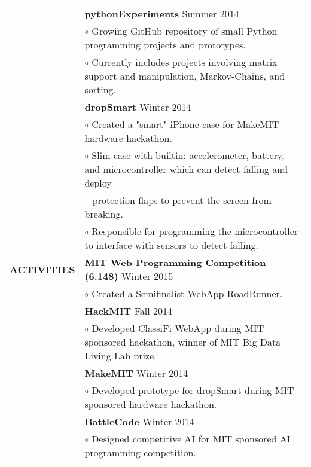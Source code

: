 \documentclass[11pt,letterpaper]{article}
\begin{document}
\begin{tabular}{@{}lp{6.6in}}
&\textbf{pythonExperiments} \hfill Summer 2014\\
&\hspace{10pt}$\circ$ Growing GitHub repository of small Python programming projects and prototypes.\\
&\hspace{10pt}$\circ$ Currently includes projects involving matrix support and manipulation, Markov-Chains, and sorting.\\

&\textbf{dropSmart} \hfill Winter 2014\\
&\hspace{10pt}$\circ$ Created a "smart" iPhone case for MakeMIT hardware hackathon.\\
&\hspace{10pt}$\circ$ Slim case with builtin: accelerometer, battery, and microcontroller which can detect falling and deploy\\
&\ \hspace{3ex} protection flaps to prevent the screen from breaking.\\
&\hspace{10pt}$\circ$ Responsible for programming the microcontroller to interface with sensors to detect falling.\\

\textbf{ACTIVITIES}
&\textbf{MIT Web Programming Competition (6.148)} \hfill Winter 2015\\
&\hspace{10pt}$\circ$ Created a Semifinalist WebApp RoadRunner.\\
&\textbf{HackMIT} \hfill Fall 2014\\
&\hspace{10pt}$\circ$ Developed ClassiFi WebApp during MIT sponsored hackathon, winner of MIT Big Data Living Lab prize.\\
&\textbf{MakeMIT} \hfill Winter 2014\\
&\hspace{10pt}$\circ$ Developed prototype for dropSmart during MIT sponsored hardware hackathon. \\
&\textbf{BattleCode} \hfill Winter 2014\\
&\hspace{10pt}$\circ$ Designed competitive AI for MIT sponsored AI programming competition. \\
\end{tabular}
\end{document}
